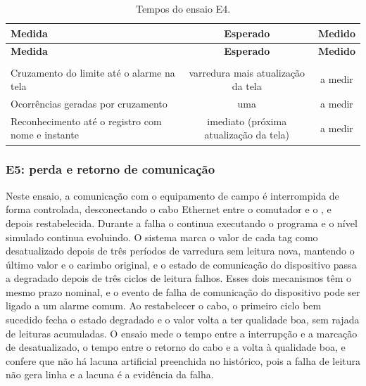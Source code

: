 
{\renewcommand{\arraystretch}{1.3}\small
\begin{xltabular}{\textwidth}{Xcc}
        \caption{Tempos do ensaio E4.}
        \label{tab:cap7_e4}\\
        \hline
        \textbf{Medida} & \textbf{Esperado} & \textbf{Medido} \\
        \hline
        \endfirsthead
        \hline
        \textbf{Medida} & \textbf{Esperado} & \textbf{Medido} \\
        \hline
        \endhead
        \endfoot
         \\
        \endlastfoot
        Cruzamento do limite até o alarme na tela & varredura mais atualização da tela & a medir \\
        \hline
        Ocorrências geradas por cruzamento & uma & a medir \\
        \hline
        Reconhecimento até o registro com nome e instante & imediato (próxima atualização da tela) & a medir \\
        \hline
\end{xltabular}}


\subsubsection{E5: perda e retorno de comunicação}

\par Neste ensaio, a comunicação com o equipamento de campo é interrompida de forma controlada, desconectando o cabo Ethernet entre o comutador e o , e depois restabelecida. Durante a falha o  continua executando o programa e o nível simulado continua evoluindo. O sistema marca o valor de cada tag como desatualizado depois de três períodos de varredura sem leitura nova, mantendo o último valor e o carimbo original, e o estado de comunicação do dispositivo passa a degradado depois de três ciclos de leitura falhos. Esses dois mecanismos têm o mesmo prazo nominal, e o evento de falha de comunicação do dispositivo pode ser ligado a um alarme comum. Ao restabelecer o cabo, o primeiro ciclo bem sucedido fecha o estado degradado e o valor volta a ter qualidade boa, sem rajada de leituras acumuladas. O ensaio mede o tempo entre a interrupção e a marcação de desatualizado, o tempo entre o retorno do cabo e a volta à qualidade boa, e confere que não há lacuna artificial preenchida no histórico, pois a falha de leitura não gera linha e a lacuna é a evidência da falha.

